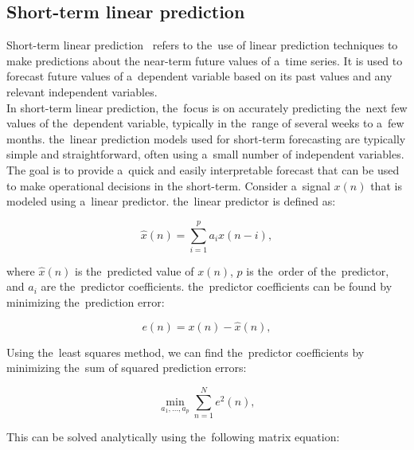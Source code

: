 \subsection{Short-term linear prediction} \label{subsec:shortlp}

Short-term linear prediction~\cite{Riahy} refers to the~use of linear prediction techniques to make predictions about
the near-term future values of a~time series. It is used to forecast future values of a~dependent variable based on
its past values and any relevant independent variables.
\\
In short-term linear prediction, the~focus is on accurately predicting the~next few values of the~dependent variable,
typically in the~range of several weeks to a~few months. the~linear prediction models used for short-term
forecasting are typically simple and straightforward, often using a~small number of independent variables.
The goal is to provide a~quick and easily interpretable forecast that can be used to make operational decisions in
the short-term.
Consider a~signal $x(n)$ that is modeled using a~linear predictor. the~linear predictor is defined as:

\begin{equation}
  \hat{x}(n) = \sum_{i=1}^{p} a_i x(n-i),
  \label{eq:linear-predictor}
\end{equation}

where $\hat{x}(n)$ is the~predicted value of $x(n)$, $p$ is the~order of the~predictor, and $a_i$ are the~predictor coefficients. the~predictor coefficients can be found by minimizing the~prediction error:

\begin{equation}
  e(n) = x(n) - \hat{x}(n),
  \label{eq:prediction-error}
\end{equation}

Using the~least squares method, we can find the~predictor coefficients by minimizing the~sum of squared prediction errors:

\begin{equation}
  \min_{a_1,\dots,a_p} \sum_{n=1}^{N} e^2(n),
  \label{eq:least-squares}
\end{equation}

This can be solved analytically using the~following matrix equation:

